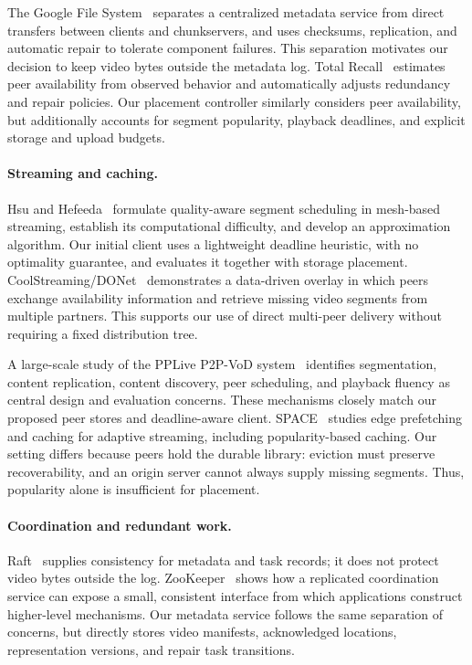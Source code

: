 \documentclass[letterpaper,twocolumn,10pt]{article}
\begin{document}
The Google File System~\cite{ghemawat2003gfs} separates a centralized
metadata service from direct transfers between clients and chunkservers,
and uses checksums, replication, and automatic repair to tolerate component
failures. This separation motivates our decision to keep video bytes outside
the metadata log. Total Recall~\cite{bhagwan2004totalrecall} estimates peer
availability from observed behavior and automatically adjusts redundancy and
repair policies. Our placement controller similarly considers peer
availability, but additionally accounts for segment popularity, playback
deadlines, and explicit storage and upload budgets.

\paragraph{Streaming and caching.}
Hsu and Hefeeda~\cite{hsu2010quality} formulate quality-aware segment
scheduling in mesh-based streaming, establish its computational difficulty,
and develop an approximation algorithm. Our initial client uses a lightweight
deadline heuristic, with no optimality guarantee, and evaluates it together
with storage placement. CoolStreaming/DONet~\cite{zhang2005coolstreaming}
demonstrates a data-driven overlay in which peers exchange availability
information and retrieve missing video segments from multiple partners. This
supports our use of direct multi-peer delivery without requiring a fixed
distribution tree.

A large-scale study of the PPLive P2P-VoD
system~\cite{huang2008p2pvod} identifies segmentation, content replication,
content discovery, peer scheduling, and playback fluency as central design
and evaluation concerns. These mechanisms closely match our proposed peer
stores and deadline-aware client. SPACE~\cite{aguilar2023space} studies edge
prefetching and caching for adaptive streaming, including popularity-based
caching. Our setting differs because peers hold the durable library:
eviction must preserve recoverability, and an origin server cannot always
supply missing segments. Thus, popularity alone is insufficient for
placement.

\paragraph{Coordination and redundant work.}
Raft~\cite{ongaro2014raft} supplies consistency for metadata and task records;
it does not protect video bytes outside the log. ZooKeeper~\cite{hunt2010zookeeper}
shows how a replicated coordination service can expose a small, consistent
interface from which applications construct higher-level mechanisms. Our
metadata service follows the same separation of concerns, but directly stores
video manifests, acknowledged locations, representation versions, and repair
task transitions.
\end{document}

